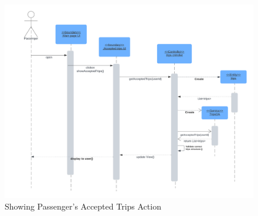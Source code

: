 \documentclass[a4paper, 12pt]{report} %
\begin{document}
    
        \begin{figure}
            \centering
            \includegraphics[width=0.9\linewidth]{Images/Passenger Accepted.png}
            \caption{Showing Passenger's Accepted Trips Action}
            \label{fig:seq_dig_pass_accepted}
        \end{figure}

        \FloatBarrier


\end{document}
